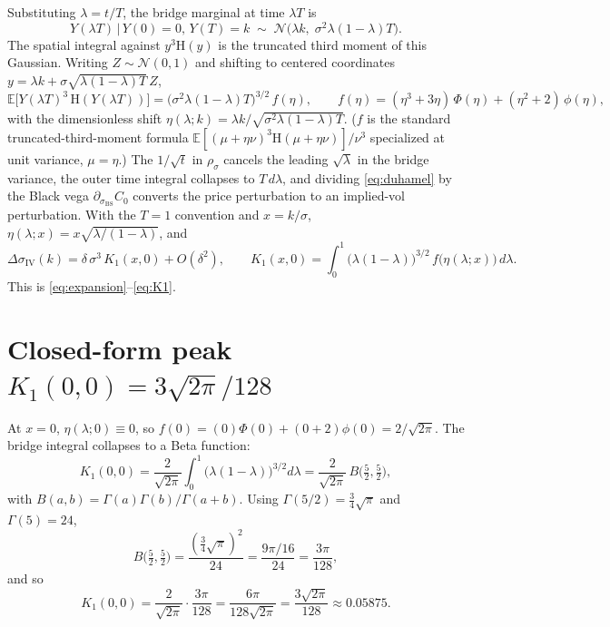\documentclass[11pt]{article}
\newcommand{\siv}{\sigma_{\mathrm{IV}}}
\newcommand{\Hev}{\mathrm{H}}
\begin{document}
Substituting $\lambda=t/T$, the bridge marginal at time $\lambda T$ is
\[
Y(\lambda T)\,\big|\,Y(0)=0,\,Y(T)=k
\;\sim\; \mathcal N\bigl(\lambda k,\;\sigma^2\lambda(1-\lambda)T\bigr).
\]
The spatial integral against $y^3\Hev(y)$ is the truncated third
moment of this Gaussian. Writing $Z\sim\mathcal N(0,1)$ and shifting
to centered coordinates $y = \lambda k + \sigma\sqrt{\lambda(1-\lambda)T}\,Z$,
\[
\mathbb E\bigl[Y(\lambda T)^3\,\Hev(Y(\lambda T))\bigr]
= \bigl(\sigma^2\lambda(1-\lambda)T\bigr)^{3/2}\,f(\eta),
\qquad
f(\eta) = (\eta^3+3\eta)\,\Phi(\eta) + (\eta^2+2)\,\phi(\eta),
\]
with the dimensionless shift $\eta(\lambda;k) = \lambda
k/\sqrt{\sigma^2\lambda(1-\lambda)T}$. ($f$ is the standard
truncated-third-moment formula
$\mathbb E[(\mu+\eta\nu)^3\Hev(\mu+\eta\nu)]/\nu^3$ specialized at
unit variance, $\mu=\eta$.) The $1/\sqrt{t}$ in $\rho_\sigma$
cancels the leading $\sqrt{\lambda}$ in the bridge variance, the
outer time integral collapses to $T\,d\lambda$, and dividing
\eqref{eq:duhamel} by the Black vega $\partial_{\sigma_{\mathrm{BS}}} C_0$
converts the price perturbation to an implied-vol perturbation. With
the $T=1$ convention and $x=k/\sigma$,
$\eta(\lambda;x) = x\sqrt{\lambda/(1-\lambda)}$, and
\begin{equation}
\Delta\siv(k) = \delta\,\sigma^3\,K_1(x,0) + O(\delta^2),
\qquad
K_1(x,0) = \int_0^1\!\bigl(\lambda(1-\lambda)\bigr)^{3/2}\,
            f\bigl(\eta(\lambda;x)\bigr)\,d\lambda.
\label{eq:K1-app}
\end{equation}
This is \eqref{eq:expansion}--\eqref{eq:K1}.

\section{Closed-form peak \texorpdfstring{$K_1(0,0)=3\sqrt{2\pi}/128$}{K1(0,0) = 3 sqrt(2 pi)/128}}\label{app:K1-ATM}

At $x=0$, $\eta(\lambda;0)\equiv0$, so $f(0) = (0)\Phi(0) +
(0+2)\phi(0) = 2/\sqrt{2\pi}$. The bridge integral collapses to a
Beta function:
\[
K_1(0,0) = \frac{2}{\sqrt{2\pi}}\int_0^1\!\bigl(\lambda(1-\lambda)\bigr)^{3/2}d\lambda
= \frac{2}{\sqrt{2\pi}}\,B\!\bigl(\tfrac52,\tfrac52\bigr),
\]
with $B(a,b) = \Gamma(a)\Gamma(b)/\Gamma(a+b)$. Using
$\Gamma(5/2) = \tfrac34\sqrt{\pi}$ and $\Gamma(5)=24$,
\[
B\!\bigl(\tfrac52,\tfrac52\bigr)
= \frac{(\tfrac34\sqrt\pi)^2}{24}
= \frac{9\pi/16}{24}
= \frac{3\pi}{128},
\]
and so
\[
K_1(0,0) = \frac{2}{\sqrt{2\pi}}\cdot\frac{3\pi}{128}
= \frac{6\pi}{128\sqrt{2\pi}}
= \frac{3\sqrt{2\pi}}{128}
\approx 0.05875.
\]
\end{document}
